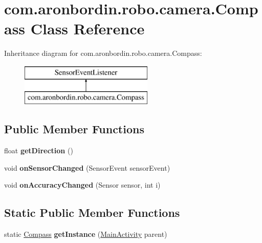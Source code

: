 \hypertarget{classcom_1_1aronbordin_1_1robo_1_1camera_1_1Compass}{\section{com.\+aronbordin.\+robo.\+camera.\+Compass Class Reference}
\label{classcom_1_1aronbordin_1_1robo_1_1camera_1_1Compass}
}
Inheritance diagram for com.\+aronbordin.\+robo.\+camera.\+Compass\+:\begin{figure}[H]
\begin{center}
\leavevmode
\includegraphics[height=2.000000cm]{dd/d76/classcom_1_1aronbordin_1_1robo_1_1camera_1_1Compass}
\end{center}
\end{figure}
\subsection*{Public Member Functions}
\begin{DoxyCompactItemize}
\item 
\hypertarget{classcom_1_1aronbordin_1_1robo_1_1camera_1_1Compass_ad8fc3c3ff2e46942b4ca3b72522cb69b}{float {\bfseries get\+Direction} ()}\label{classcom_1_1aronbordin_1_1robo_1_1camera_1_1Compass_ad8fc3c3ff2e46942b4ca3b72522cb69b}

\item 
\hypertarget{classcom_1_1aronbordin_1_1robo_1_1camera_1_1Compass_a243c66a814b76eef928a6d66052af458}{void {\bfseries on\+Sensor\+Changed} (Sensor\+Event sensor\+Event)}\label{classcom_1_1aronbordin_1_1robo_1_1camera_1_1Compass_a243c66a814b76eef928a6d66052af458}

\item 
\hypertarget{classcom_1_1aronbordin_1_1robo_1_1camera_1_1Compass_a43a2245d2f010b82efe1c99bddefcb69}{void {\bfseries on\+Accuracy\+Changed} (Sensor sensor, int i)}\label{classcom_1_1aronbordin_1_1robo_1_1camera_1_1Compass_a43a2245d2f010b82efe1c99bddefcb69}

\end{DoxyCompactItemize}
\subsection*{Static Public Member Functions}
\begin{DoxyCompactItemize}
\item 
\hypertarget{classcom_1_1aronbordin_1_1robo_1_1camera_1_1Compass_a2c6b03eadead8f2b81ea95ef062b37db}{static \hyperlink{classcom_1_1aronbordin_1_1robo_1_1camera_1_1Compass}{Compass} {\bfseries get\+Instance} (\hyperlink{classcom_1_1aronbordin_1_1robo_1_1camera_1_1MainActivity}{Main\+Activity} parent)}\label{classcom_1_1aronbordin_1_1robo_1_1camera_1_1Compass_a2c6b03eadead8f2b81ea95ef062b37db}

\end{DoxyCompactItemize}


